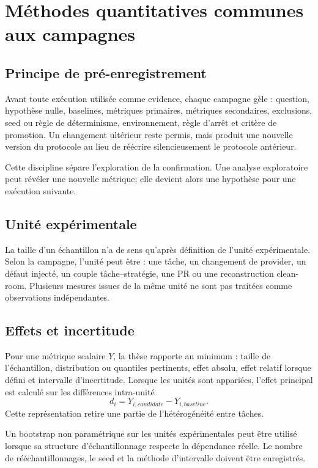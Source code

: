 \chapter{Méthodes quantitatives communes aux campagnes}

\section{Principe de pré-enregistrement}

Avant toute exécution utilisée comme evidence, chaque campagne gèle : question, hypothèse nulle, baselines, métriques primaires, métriques secondaires, exclusions, seed ou règle de déterminisme, environnement, règle d'arrêt et critère de promotion. Un changement ultérieur reste permis, mais produit une nouvelle version du protocole au lieu de réécrire silencieusement le protocole antérieur.

Cette discipline sépare l'exploration de la confirmation. Une analyse exploratoire peut révéler une nouvelle métrique; elle devient alors une hypothèse pour une exécution suivante.

\section{Unité expérimentale}

La taille d'un échantillon n'a de sens qu'après définition de l'unité expérimentale. Selon la campagne, l'unité peut être : une tâche, un changement de provider, un défaut injecté, un couple tâche--stratégie, une PR ou une reconstruction clean-room. Plusieurs mesures issues de la même unité ne sont pas traitées comme observations indépendantes.

\section{Effets et incertitude}

Pour une métrique scalaire $Y$, la thèse rapporte au minimum : taille de l'échantillon, distribution ou quantiles pertinents, effet absolu, effet relatif lorsque défini et intervalle d'incertitude. Lorsque les unités sont appariées, l'effet principal est calculé sur les différences intra-unité
\[
d_i=Y_{i,candidate}-Y_{i,baseline}.
\]
Cette représentation retire une partie de l'hétérogénéité entre tâches.

Un bootstrap non paramétrique sur les unités expérimentales peut être utilisé lorsque sa structure d'échantillonnage respecte la dépendance réelle. Le nombre de rééchantillonnages, le seed et la méthode d'intervalle doivent être enregistrés.


